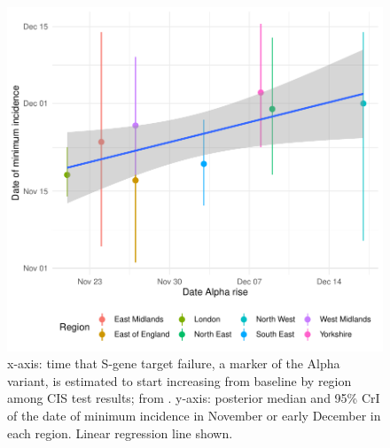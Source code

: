 \documentclass[thesis.tex]{subfiles}
\begin{document}
\begin{figure}
    \includegraphics{transmission/backcalc-alpha}
    \caption[Correlation of the emergence of Alpha and minimum incidence.]{%
        x-axis: time that S-gene target failure, a marker of the Alpha variant, is estimated to start increasing from baseline by region among CIS test results; from \textcite[table S3]{walkerTracking}.
        y-axis: posterior median and 95\% CrI of the date of minimum incidence in November or early December in each region.
        Linear regression line shown.
    }
    \label{transmission:fig:backcalc-alpha}
\end{figure}
\end{document}
